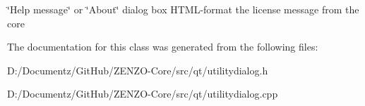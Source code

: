 \char`\"{}\+Help message\char`\"{} or \char`\"{}\+About\char`\"{} dialog box H\+T\+M\+L-\/format the license message from the core 

The documentation for this class was generated from the following files\+:\begin{DoxyCompactItemize}
\item 
D\+:/\+Documentz/\+Git\+Hub/\+Z\+E\+N\+Z\+O-\/\+Core/src/qt/utilitydialog.\+h\item 
D\+:/\+Documentz/\+Git\+Hub/\+Z\+E\+N\+Z\+O-\/\+Core/src/qt/utilitydialog.\+cpp\end{DoxyCompactItemize}
